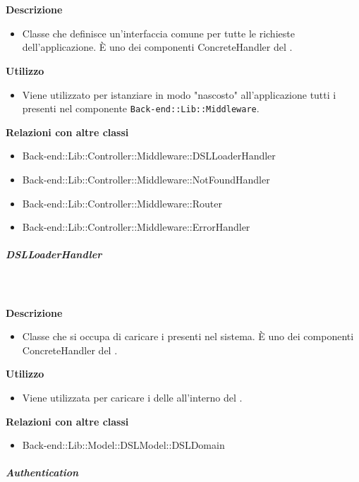 				\textbf{\\ \\ Descrizione} 
					\begin{itemize}
						\item[] Classe che definisce un'interfaccia comune per tutte le richieste dell'applicazione. È uno dei componenti ConcreteHandler del  .
					\end{itemize}      
				\textbf{Utilizzo}  
					\begin{itemize}
						\item[] Viene utilizzato per istanziare in modo "nascosto" all'applicazione tutti i  presenti nel componente \texttt{Back-end::Lib::Middleware}.
					\end{itemize}
					\textbf{Relazioni con altre classi}
					\begin{itemize}
							\item{Back-end::Lib::Controller::Middleware::DSLLoaderHandler}
							\item{Back-end::Lib::Controller::Middleware::NotFoundHandler}
							\item{Back-end::Lib::Controller::Middleware::Router}
							\item{Back-end::Lib::Controller::Middleware::ErrorHandler}
					\end{itemize}
			\subparagraph{DSLLoaderHandler}
				
				\textbf{\\ \\ Descrizione} 
					\begin{itemize}
						\item[] Classe che si occupa di caricare i  presenti nel sistema. È uno dei componenti ConcreteHandler del  .
					\end{itemize}      
				\textbf{Utilizzo}  
					\begin{itemize}
						\item[] Viene utilizzata per caricare i  delle  all'interno del .
					\end{itemize}
					\textbf{Relazioni con altre classi}
					\begin{itemize}
							\item{Back-end::Lib::Model::DSLModel::DSLDomain}
					\end{itemize}
			\subparagraph{Authentication}
				
